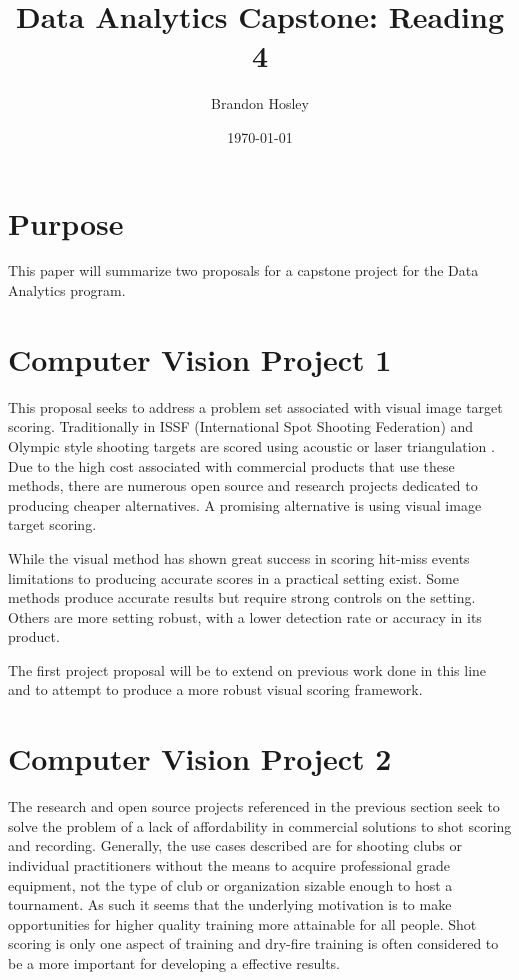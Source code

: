 \documentclass[]{article}
\title{Data Analytics Capstone: Reading 4}
\author{Brandon Hosley}
\date{\today}
\begin{document}
	\maketitle
	
\section{Purpose} 

This paper will summarize two proposals for a capstone project for the Data Analytics program.

\section{Computer Vision Project 1}

This proposal seeks to address a problem set associated with visual image target scoring. Traditionally in ISSF (International Spot Shooting Federation) and Olympic style shooting
targets are scored using acoustic or laser triangulation 
\cite{Anderson2018} \cite{SUIS}.
Due to the high cost associated with commercial products that use these methods, 
there are numerous open source \cite{etarg} \cite{freetarget}
and research projects \cite{Rudzinski2012} \cite{Stenhager2021}
dedicated to producing cheaper alternatives.
A promising alternative is using visual image target scoring.

While the visual method has shown great success in scoring hit-miss events \cite{Ye2011}
limitations to producing accurate scores in a practical setting exist.
Some methods \cite{Rudzinski2012} produce accurate results 
but require strong controls on the setting.
Others \cite{Stenhager2021} are more setting robust, 
with a lower detection rate or accuracy in its product.

The first project proposal will be to extend on previous work done in this line and to  attempt to produce a more robust visual scoring framework.

\section{Computer Vision Project 2}

The research and open source projects referenced in the previous section seek to solve the problem of a lack of affordability in commercial solutions to shot scoring and recording.
Generally, the use cases described are for shooting clubs or individual practitioners without the means to acquire professional grade equipment, not the type of club or organization sizable enough to host a tournament.
As such it seems that the underlying motivation is to make opportunities for higher quality training more attainable for all people.
Shot scoring is only one aspect of training and dry-fire training is often \cite{Potter2017}
considered to be a more important for developing a effective results.
\end{document}
